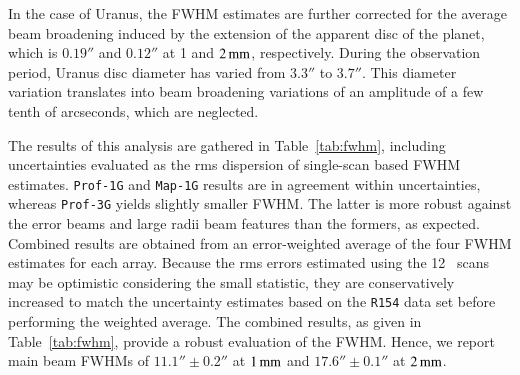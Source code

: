 In the case of Uranus, the FWHM estimates are further corrected for
the {\lp average beam broadening induced by the extension of the
apparent disc of the planet, which is $0.19''$ and $0.12''$ at 1 and
$2\,\rm{mm}$, respectively.}
{\lp During the observation period, Uranus disc diameter has varied
from $3.3''$ to $3.7''$. This diameter variation translates into beam
broadening variations of an amplitude of a few tenth of arcseconds,
which are neglected.}  

The results of this analysis are
gathered in Table~\ref{tab:fwhm}, including uncertainties evaluated as
the rms dispersion of single-scan based FWHM estimates.
{\tt Prof-1G} and {\tt Map-1G} results are in agreement within
uncertainties, whereas {\tt Prof-3G} yields slightly smaller FWHM.
{\lp The latter is more robust against the error beams and large radii
beam features than the formers, as expected.}
Combined results are obtained from an error-weighted
average of the four FWHM estimates for each array.
Because the rms errors estimated using the 12 \bm\ scans may be
optimistic considering the small statistic, they are conservatively
increased to match the uncertainty estimates based on the {\tt R154}
data set before performing the weighted average.  
The combined results, as given in
Table~\ref{tab:fwhm}, provide a robust evaluation of the
FWHM. Hence, we report main beam FWHMs of $11.1'' \pm 0.2''$ at
$1\, \rm{mm}$ and $17.6''\pm 0.1''$ at $2\, \rm{mm}$.  

